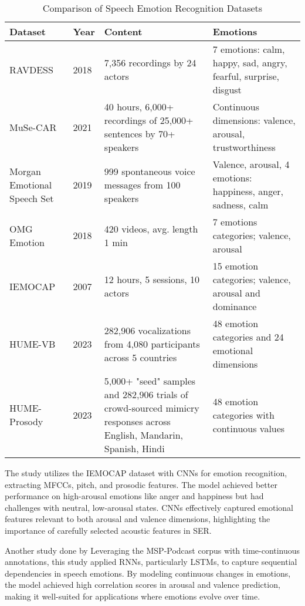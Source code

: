 \begin{table}[h!]
\centering
\begin{tabularx}{\textwidth}{|X|X|X|X|}
\hline
\textbf{Dataset} & \textbf{Year} & \textbf{Content} & \textbf{Emotions} \\
\hline
RAVDESS 
    & 2018 
    & 7,356 recordings by 24 actors 
    & 7 emotions: calm, happy, sad, angry, fearful, surprise, disgust \\
\hline
MuSe-CAR 
    & 2021 
    & 40 hours, 6,000+ recordings of 25,000+ sentences by 70+ speakers 
    & Continuous dimensions: valence, arousal, trustworthiness \\
\hline
Morgan Emotional Speech Set 
    & 2019 
    & 999 spontaneous voice messages from 100 speakers 
    & Valence, arousal, 4 emotions: happiness, anger, sadness, calm \\
\hline
OMG Emotion 
    & 2018 
    & 420 videos, avg. length 1 min 
    & 7 emotions categories; valence, arousal \\
\hline
IEMOCAP 
    & 2007 
    & 12 hours, 5 sessions, 10 actors 
    & 15 emotion categories; valence, arousal and dominance \\
\hline
HUME-VB 
    & 2023 
    & 282,906 vocalizations from 4,080 participants across 5 countries 
    & 48 emotion categories and 24 emotional dimensions \\
\hline
HUME-Prosody 
    & 2023 
    & 5,000+ "seed" samples and 282,906 trials of crowd-sourced mimicry responses across English, Mandarin, Spanish, Hindi 
    & 48 emotion categories with continuous  values \\
\hline
\end{tabularx}
\caption{Comparison of Speech Emotion Recognition Datasets}
\label{tab:ser_datasets}
\end{table}

\par The study \cite{zhang2017speech} utilizes the IEMOCAP dataset with CNNs for emotion recognition, extracting MFCCs, pitch, and prosodic features. The model achieved better performance on high-arousal emotions like anger and happiness but had challenges with neutral, low-arousal states. CNNs effectively captured emotional features relevant to both arousal and valence dimensions, highlighting the importance of carefully selected acoustic features in SER.

\par Another study done by \cite{martinez2020msp} Leveraging the MSP-Podcast corpus with time-continuous annotations, this study applied RNNs, particularly LSTMs, to capture sequential dependencies in speech emotions. By modeling continuous changes in emotions, the model achieved high correlation scores in arousal and valence prediction, making it well-suited for applications where emotions evolve over time.

